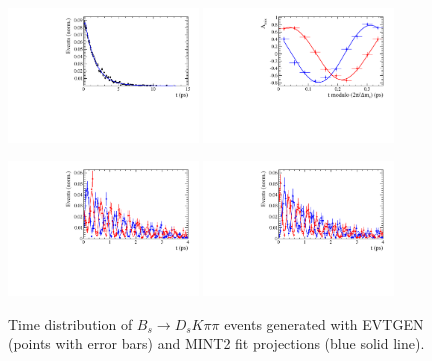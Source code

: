 \begin{figure}[h]
	\centering
		\includegraphics[width=0.45\textwidth, height = !]{figs/timeFit/signal_DsKpipi_CPV_MC/h_t.pdf} 
		\includegraphics[width=0.45\textwidth, height = !]{figs/timeFit/signal_DsKpipi_CPV_MC/h_asym.pdf} 

		\includegraphics[width=0.45\textwidth, height = !]{figs/timeFit/signal_DsKpipi_CPV_MC/h_t_mixed_m.pdf} 
		\includegraphics[width=0.45\textwidth, height = !]{figs/timeFit/signal_DsKpipi_CPV_MC/h_t_mixed_p.pdf} 
		
		\caption{Time distribution of $B_s \to D_s K \pi\pi$ events generated with \textsf{EVTGEN} (points with error bars) and \textsf{MINT2} fit projections (blue solid line).} 		
\end{figure}	

